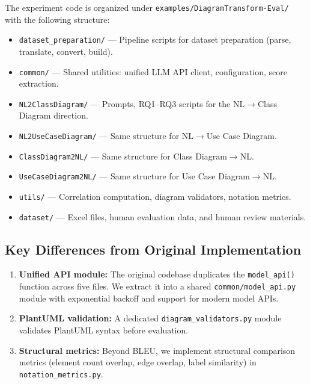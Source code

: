 \documentclass[lettersize,journal]{IEEEtran}
\begin{document}
The experiment code is organized under \texttt{examples/DiagramTransform-Eval/} with the following structure:

\begin{itemize}
    \item \texttt{dataset\_preparation/} --- Pipeline scripts for dataset preparation (parse, translate, convert, build).
    \item \texttt{common/} --- Shared utilities: unified LLM API client, configuration, score extraction.
    \item \texttt{NL2ClassDiagram/} --- Prompts, RQ1--RQ3 scripts for the NL$\rightarrow$Class Diagram direction.
    \item \texttt{NL2UseCaseDiagram/} --- Same structure for NL$\rightarrow$Use Case Diagram.
    \item \texttt{ClassDiagram2NL/} --- Same structure for Class Diagram$\rightarrow$NL.
    \item \texttt{UseCaseDiagram2NL/} --- Same structure for Use Case Diagram$\rightarrow$NL.
    \item \texttt{utils/} --- Correlation computation, diagram validators, notation metrics.
    \item \texttt{dataset/} --- Excel files, human evaluation data, and human review materials.
\end{itemize}

\subsection{Key Differences from Original Implementation}

\begin{enumerate}
    \item \textbf{Unified API module:} The original codebase duplicates the \texttt{model\_api()} function across five files. We extract it into a shared \texttt{common/model\_api.py} module with exponential backoff and support for modern model APIs.
    \item \textbf{PlantUML validation:} A dedicated \texttt{diagram\_validators.py} module validates PlantUML syntax before evaluation.
    \item \textbf{Structural metrics:} Beyond BLEU, we implement structural comparison metrics (element count overlap, edge overlap, label similarity) in \texttt{notation\_metrics.py}.
\end{enumerate}

\end{document}
